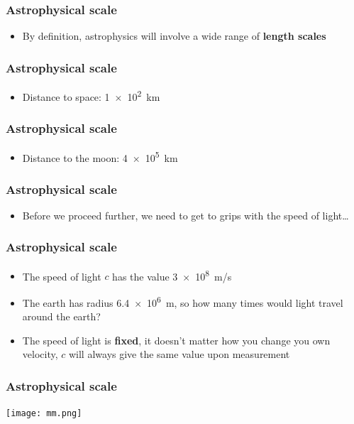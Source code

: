 \documentclass{beamer}
\begin{document}
\begin{frame}
  \frametitle{Astrophysical scale}
  \begin{itemize}
    \item By definition, astrophysics will involve a wide range of \textbf{length scales}
  \end{itemize}
\end{frame}

\begin{frame}
  \frametitle{Astrophysical scale}
  \begin{itemize}
    \item Distance to space: \SI{1e2}{km}
  \end{itemize}
\end{frame}

\begin{frame}
  \frametitle{Astrophysical scale}
  \begin{itemize}
    \item Distance to the moon: \SI{4e5}{km}
  \end{itemize}
\end{frame}

\begin{frame}
  \frametitle{Astrophysical scale}
  \begin{itemize}
    \item Before we proceed further, we need to get to grips with the speed of light\ldots
  \end{itemize}
\end{frame}

\begin{frame}
  \frametitle{Astrophysical scale}
  \begin{itemize}
    \item The speed of light $c$ has the value \SI{3e8}{m/s}
    \item The earth has radius \SI{6.4e6}{m}, so how many times would light travel around the earth?
    \item The speed of light is \textbf{fixed}, it doesn't matter how you change you own velocity, $c$ will always give the same value upon measurement
  \end{itemize}
\end{frame}

\begin{frame}
  \frametitle{Astrophysical scale}
  \center
  \texttt{[image: mm.png]}
\end{frame}
\end{document}
